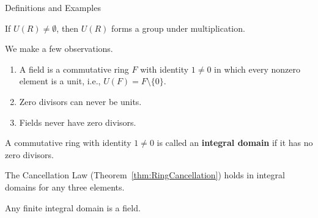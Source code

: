 \begin{section}{Definitions and Examples}
\begin{theorem}
If $U(R)\neq\emptyset$, then $U(R)$ forms a group under multiplication.
\end{theorem}

\begin{remark}
We make a few observations.
\begin{enumerate}[label=\rm{(\alph*)}]
\item A field is a commutative ring $F$ with identity $1\neq 0$ in which every nonzero element is a unit, i.e., $U(F)=F\setminus\{0\}$.
\item Zero divisors can never be units.
\item Fields never have zero divisors.
\end{enumerate}
\end{remark}

\begin{definition}
A commutative ring with identity $1\neq 0$ is called an \textbf{integral domain} if it has no zero divisors.
\end{definition}

\begin{remark}
The Cancellation Law (Theorem~\ref{thm:RingCancellation}) holds in integral domains for any three elements.
\end{remark}

\begin{theorem}
Any finite integral domain is a field.
\end{theorem}



\end{section}
